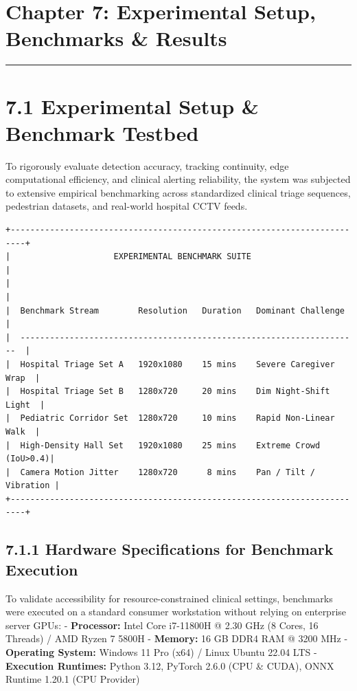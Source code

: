 \section{Chapter 7: Experimental Setup, Benchmarks \&
Results}\label{chapter-7-experimental-setup-benchmarks-results}

\begin{center}\rule{0.5\linewidth}{0.5pt}\end{center}

\section{7.1 Experimental Setup \& Benchmark
Testbed}\label{experimental-setup-benchmark-testbed}

To rigorously evaluate detection accuracy, tracking continuity, edge
computational efficiency, and clinical alerting reliability, the system
was subjected to extensive empirical benchmarking across standardized
clinical triage sequences, pedestrian datasets, and real-world hospital
CCTV feeds.

\begin{verbatim}
+-------------------------------------------------------------------------+
|                     EXPERIMENTAL BENCHMARK SUITE                        |
|                                                                         |
|  Benchmark Stream        Resolution   Duration   Dominant Challenge     |
|  ---------------------------------------------------------------------  |
|  Hospital Triage Set A   1920x1080    15 mins    Severe Caregiver Wrap  |
|  Hospital Triage Set B   1280x720     20 mins    Dim Night-Shift Light  |
|  Pediatric Corridor Set  1280x720     10 mins    Rapid Non-Linear Walk  |
|  High-Density Hall Set   1920x1080    25 mins    Extreme Crowd (IoU>0.4)|
|  Camera Motion Jitter    1280x720      8 mins    Pan / Tilt / Vibration |
+-------------------------------------------------------------------------+
\end{verbatim}

\subsection{7.1.1 Hardware Specifications for Benchmark
Execution}\label{hardware-specifications-for-benchmark-execution}

To validate accessibility for resource-constrained clinical settings,
benchmarks were executed on a standard consumer workstation without
relying on enterprise server GPUs: - \textbf{Processor:} Intel Core
i7-11800H @ 2.30 GHz (8 Cores, 16 Threads) / AMD Ryzen 7 5800H -
\textbf{Memory:} 16 GB DDR4 RAM @ 3200 MHz - \textbf{Operating System:}
Windows 11 Pro (x64) / Linux Ubuntu 22.04 LTS - \textbf{Execution
Runtimes:} Python 3.12, PyTorch 2.6.0 (CPU \& CUDA), ONNX Runtime 1.20.1
(CPU Provider)

